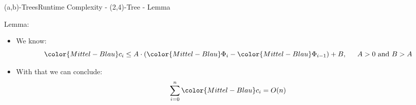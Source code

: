 


\begin{frame}{(a,b)-Trees}{Runtime Complexity - (2,4)-Tree - Lemma}
  \begin{block}{Lemma:}
    \begin{itemize}
      \item<2->
        We know:
        \begin{displaymath}
        {\color{Mittel-Blau}c_i} \leq A \cdot \left(
        {\color{Mittel-Blau}\Phi_i} - {\color{Mittel-Blau}\Phi_{i-1}}
        \right) + B, \hspace{1.5em} A > 0 \text{ and } B > A
        \end{displaymath}
      \item<3->
        With that we can conclude:
        \begin{displaymath}
          \sum_{i=0}^{n} {\color{Mittel-Blau}c_i} = O(n)
        \end{displaymath}
    \end{itemize}
  \end{block}
\end{frame}

